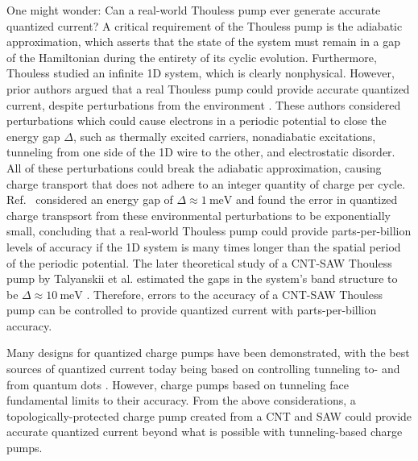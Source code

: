 \documentclass[double,12pt,1in,seploa]{beavtex}
\begin{document}
One might wonder: Can a real-world Thouless pump ever generate accurate quantized current? A critical requirement of the Thouless pump is the adiabatic approximation, which asserts that the state of the system must remain in a gap of the Hamiltonian during the entirety of its cyclic evolution. Furthermore, Thouless studied an infinite 1D system, which is clearly nonphysical. However, prior authors argued that a real Thouless pump could provide accurate quantized current, despite perturbations from the environment \cite{niu_towards_1990, niu_quantised_1984}. These authors considered perturbations which could cause electrons in a periodic potential to close the energy gap $\Delta$, such as thermally excited carriers, nonadiabatic excitations, tunneling from one side of the 1D wire to the other, and electrostatic disorder. All of these perturbations could break the adiabatic approximation, causing charge transport that does not adhere to an integer quantity of charge per cycle. Ref.\ \cite{niu_towards_1990} considered an energy gap of $\Delta \approx \SI{1}{\milli\electronvolt}$ and found the error in quantized charge transpsort from these environmental perturbations to be exponentially small, concluding that a real-world Thouless pump could provide parts-per-billion levels of accuracy if the 1D system is many times longer than the spatial period of the periodic potential. The later theoretical study of a CNT-SAW Thouless pump by Talyanskii et al. estimated the gaps in the system's band structure to be $\Delta \approx \SI{10}{\milli\electronvolt}$ \cite{talyanskii_quantized_2001}. Therefore, errors to the accuracy of a CNT-SAW Thouless pump can be controlled to provide quantized current with parts-per-billion accuracy. 

Many designs for quantized charge pumps have been demonstrated, with the best sources of quantized current today being based on controlling tunneling to- and from quantum dots \cite{scherer_singleelectron_2019}. However, charge pumps based on tunneling face fundamental limits to their accuracy. From the above considerations, a topologically-protected charge pump created from a CNT and SAW could provide accurate quantized current beyond what is possible with tunneling-based charge pumps.

\end{document}
